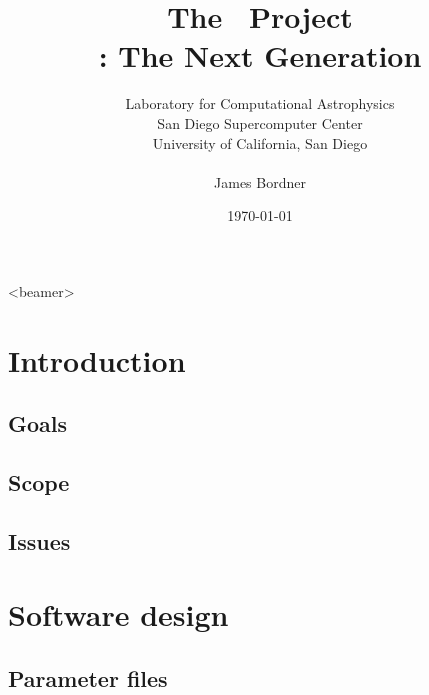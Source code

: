 \documentclass{beamer}
\title[The \cello\ Project]
      {The \cello\ Project \\ \small{\enzo: The Next Generation}}
\author[James Bordner]{\small Laboratory for Computational Astrophysics \\ San Diego Supercomputer Center \\ University of California, San Diego \\ \ \\ James Bordner}
\date{\today}
\begin{document}
\frame{\titlepage}
{
  \begin{frame}<beamer>
  \end{frame}
}


\section{Introduction}

% 

\subsection{Goals}



\subsection{Scope}




\subsection{Issues}





\section{Software design}

\subsection{Parameter files}
\end{document}
